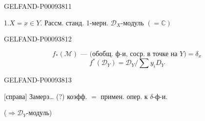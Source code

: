 \begin{GelfandAdjacentEvidence}{GELFAND-P000938}{11}


1.\enspace $X=x\in Y$. Рассм. станд. 1-мерн. $\mathcal D_X$-модуль $(=\mathbb C)$
\end{GelfandAdjacentEvidence}
\begin{GelfandAdjacentEvidence}{GELFAND-P000938}{12}

\[
 f_*(\mathcal M)\text{ --- (обобщ. ф-и, соср. в точке на }Y\text{)}=\delta_x
\]
\[
 f^*(\mathcal D_Y)=\mathcal D_Y/\sum y_iD_Y
\]
\end{GelfandAdjacentEvidence}
\begin{GelfandAdjacentEvidence}{GELFAND-P000938}{13}


[справа] Замерз… (?) коэфф. $=$ примен. опер. к $\delta$-ф-и.
\end{GelfandAdjacentEvidence}


($\Rightarrow\mathcal D_Y$-модуль)

